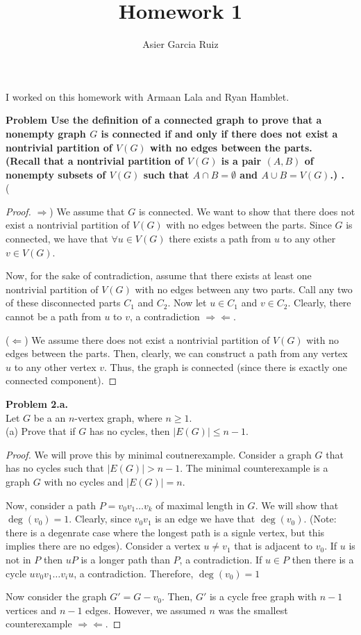 \documentclass{article}
\title{Homework 1}
\author{Asier Garcia Ruiz}
\newcommand{\contradiction}{\Rightarrow\!\Leftarrow}
\newenvironment{hwproof}[2]
{
    \textbf{Problem #1.}\\
    #2
    \begin{proof}
}{
    \end{proof}
}
\begin{document}
\maketitle

I worked on this homework with Armaan Lala and Ryan Hamblet.

\begin{hwproof}{1}{
        Use the definition of a connected graph to prove that a nonempty graph $G$
        is connected if and only if there does not exist a nontrivial partition of $V(G)$
        with no edges between the parts.\\
        (Recall that a nontrivial partition of $V(G)$ is a pair $(A, B)$ of nonempty subsets
        of $V(G)$ such that $A \cap B = \emptyset$ and $A \cup B = V(G)$.)
    }
    ($\Rightarrow$) We assume that $G$ is connected. We want to show that there does not exist
    a nontrivial partition of $V(G)$ with no edges between the parts. Since $G$ is connected,
    we have that $\forall u \in V(G)$ there exists a path from $u$ to any other $v \in V(G)$.

    Now, for the sake of contradiction, assume that there exists at least one nontrivial partition of
    $V(G)$ with no edges between any two parts. Call any two of these disconnected parts $C_1$
    and $C_2$. Now let $u \in C_1$ and $v \in C_2$. Clearly, there cannot be a path from
    $u$ to $v$, a contradiction $\contradiction$.

    ($\Leftarrow$) We assume there does not exist a nontrivial partition of $V(G)$ with no edges
    between the parts. Then, clearly, we can construct a path from any vertex $u$ to any other
    vertex $v$. Thus, the graph is connected (since there is exactly one connected component).
\end{hwproof}

\begin{hwproof}{2.a}{
        Let $G$ be a an $n$-vertex graph, where $n \geq 1$.\\
        (a) Prove that if $G$ has no cycles, then $|E(G)| \leq n - 1$.
    }
    We will prove this by minimal coutnerexample. Consider a graph $G$ that has no cycles such
    that $|E(G)| > n - 1$. The minimal counterexample is a graph $G$ with no cycles and
    $|E(G)| = n$.

    Now, consider a path $P = v_0v_1\dots v_k$ of maximal length in $G$. We will show that
    $\deg(v_0) = 1$. Clearly, since $v_0v_1$ is an edge we have that $\deg(v_0)$. (Note:
    there is a degenrate case where the longest path is a signle vertex, but this implies there
    are no edges).
    Consider a vertex $u \neq v_1$ that is adjacent to $v_0$. If $u$ is not in $P$
    then $uP$ is a longer path than $P$, a contradiction. If $u \in P$ then there is a cycle
    $uv_0v_1\dots v_iu$, a contradiction. Therefore, $\deg(v_0) = 1$

    Now consider the graph $G' = G - v_0$. Then, $G'$ is a cycle free graph with $n - 1$
    vertices and $n - 1$ edges. However, we assumed $n$ was the smallest counterexample
    $\contradiction$.

\end{hwproof}
\end{document}
